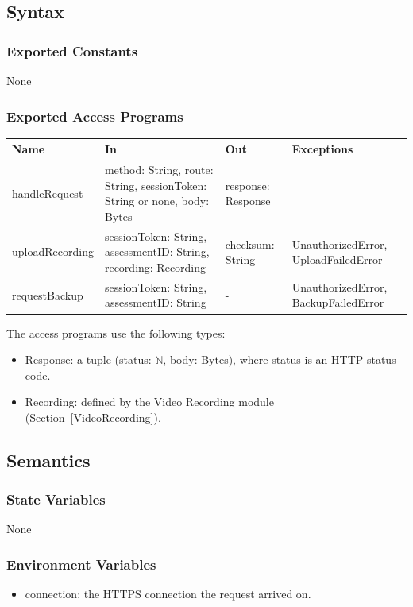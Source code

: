 \documentclass[12pt, titlepage]{article}
\begin{document}
\subsection{Syntax}

\subsubsection{Exported Constants}
None

\subsubsection{Exported Access Programs}

\begin{center}
\begin{tabular}{p{3cm} p{4.5cm} p{3.5cm} p{4cm}}
\hline
\textbf{Name} & \textbf{In} & \textbf{Out} & \textbf{Exceptions} \\
\hline
handleRequest & method: String, route: String, sessionToken: String or none,
  body: Bytes & response: Response & - \\
uploadRecording & sessionToken: String, assessmentID: String,
  recording: Recording & checksum: String & UnauthorizedError,
  UploadFailedError \\
requestBackup & sessionToken: String, assessmentID: String & - &
  UnauthorizedError, BackupFailedError \\
\hline
\end{tabular}
\end{center}

\noindent The access programs use the following types:
\begin{itemize}
\item Response: a tuple (status: $\mathbb{N}$, body: Bytes), where status is an
  HTTP status code.
\item Recording: defined by the Video Recording module
  (Section~\ref{VideoRecording}).
\end{itemize}

\subsection{Semantics}

\subsubsection{State Variables}
None

\subsubsection{Environment Variables}
\begin{itemize}
\item connection: the HTTPS connection the request arrived on.
\end{itemize}
\end{document}
